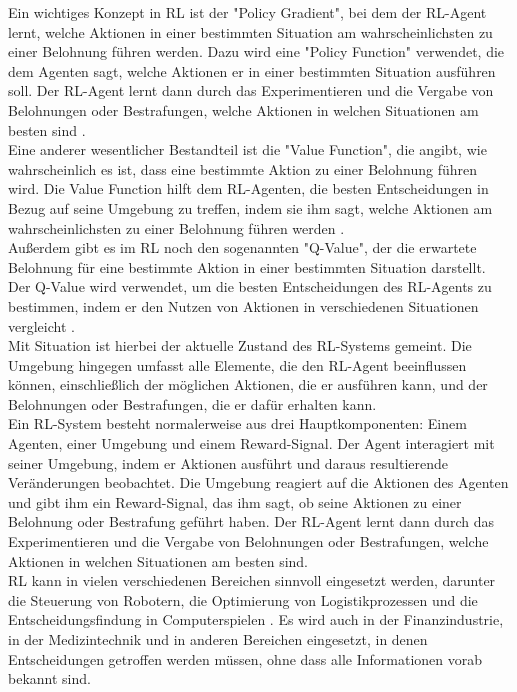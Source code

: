 \documentclass[oneside,bibliography=totocnumbered,BCOR=5mm]{scrbook}%
\theoremstyle{definition}
\theoremstyle{definition}
\theoremstyle{definition}
\theoremstyle{definition}
\theoremstyle{definition}
\theoremstyle{definition}
\begin{document}
Ein wichtiges Konzept in RL ist der "Policy Gradient", bei dem der RL-Agent lernt, 
welche Aktionen in einer bestimmten Situation am wahrscheinlichsten zu einer Belohnung führen werden. 
Dazu wird eine "Policy Function" verwendet, die dem Agenten sagt, welche Aktionen er in einer bestimmten Situation ausführen soll. 
Der RL-Agent lernt dann durch das Experimentieren und die Vergabe von Belohnungen oder Bestrafungen, 
welche Aktionen in welchen Situationen am besten sind \autocite[Seite 5]{deepRL}. \\


Eine anderer wesentlicher Bestandteil ist die "Value Function", 
die angibt, wie wahrscheinlich es ist, dass eine bestimmte Aktion zu einer Belohnung führen wird. 
Die Value Function hilft dem RL-Agenten, die besten Entscheidungen in Bezug auf seine Umgebung zu treffen, 
indem sie ihm sagt, welche Aktionen am wahrscheinlichsten zu einer Belohnung führen werden \autocite[Seite 6]{deepRL}. \\


Außerdem gibt es im RL noch den sogenannten "Q-Value", der die erwartete Belohnung für eine 
bestimmte Aktion in einer bestimmten Situation darstellt. 
Der Q-Value wird verwendet, um die besten Entscheidungen des RL-Agents zu bestimmen, 
indem er den Nutzen von Aktionen in verschiedenen Situationen vergleicht \autocite[Seite 4]{deepRL}. \\


Mit Situation ist hierbei der aktuelle Zustand des RL-Systems gemeint. 
Die Umgebung hingegen umfasst alle Elemente, die den RL-Agent beeinflussen können, 
einschließlich der möglichen Aktionen, die er ausführen kann, und der Belohnungen oder Bestrafungen, 
die er dafür erhalten kann. \\


Ein RL-System besteht normalerweise aus drei Hauptkomponenten: 
Einem Agenten, einer Umgebung und einem Reward-Signal. Der Agent interagiert mit seiner Umgebung, 
indem er Aktionen ausführt und daraus resultierende Veränderungen beobachtet. 
Die Umgebung reagiert auf die Aktionen des Agenten und gibt ihm ein Reward-Signal, 
das ihm sagt, ob seine Aktionen zu einer Belohnung oder Bestrafung geführt haben. 
Der RL-Agent lernt dann durch das Experimentieren und die Vergabe von Belohnungen oder Bestrafungen, 
welche Aktionen in welchen Situationen am besten sind. \\


RL kann in vielen verschiedenen Bereichen sinnvoll eingesetzt werden, darunter die Steuerung von Robotern, 
die Optimierung von Logistikprozessen und die Entscheidungsfindung in Computerspielen \autocite[Seite 1]{deepRL}. 
Es wird auch in der Finanzindustrie, in der Medizintechnik und in anderen Bereichen eingesetzt, 
in denen Entscheidungen getroffen werden müssen, ohne dass alle Informationen vorab bekannt sind. \\
\end{document}
